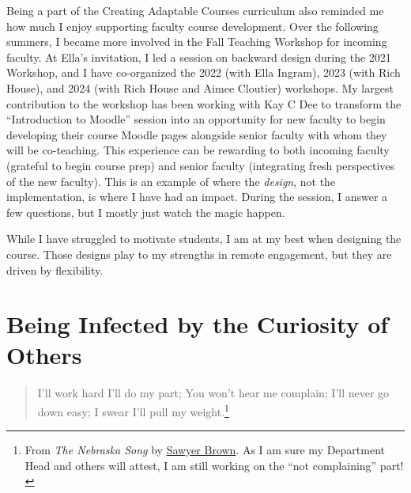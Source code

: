 \documentclass[
  letterpaper,
  DIV=11,
  numbers=noendperiod]{scrreprt}
\begin{document}
Being a part of the Creating Adaptable Courses curriculum also reminded
me how much I enjoy supporting faculty course development. Over the
following summers, I became more involved in the Fall Teaching Workshop
for incoming faculty. At Ella's invitation, I led a session on backward
design during the 2021 Workshop, and I have co-organized the 2022 (with
Ella Ingram), 2023 (with Rich House), and 2024 (with Rich House and
Aimee Cloutier) workshops. My largest contribution to the workshop has
been working with Kay C Dee to transform the ``Introduction to Moodle''
session into an opportunity for new faculty to begin developing their
course Moodle pages alongside senior faculty with whom they will be
co-teaching. This experience can be rewarding to both incoming faculty
(grateful to begin course prep) and senior faculty (integrating fresh
perspectives of the new faculty). This is an example of where the
\emph{design}, not the implementation, is where I have had an impact.
During the session, I answer a few questions, but I mostly just watch
the magic happen.

\begin{tcolorbox}[enhanced jigsaw, coltitle=black, colframe=quarto-callout-tip-color-frame, opacityback=0, rightrule=.15mm, bottomrule=.15mm, leftrule=.75mm, bottomtitle=1mm, colbacktitle=quarto-callout-tip-color!10!white, breakable, titlerule=0mm, title=\textcolor{quarto-callout-tip-color}{\faLightbulb}\hspace{0.5em}{Operating from My Strengths}, left=2mm, toptitle=1mm, toprule=.15mm, colback=white, arc=.35mm, opacitybacktitle=0.6]

While I have struggled to motivate students, I am at my best when
designing the course. Those designs play to my strengths in remote
engagement, but they are driven by flexibility.

\end{tcolorbox}


\chapter{Being Infected by the Curiosity of
Others}\label{being-infected-by-the-curiosity-of-others}

\begin{quote}
I'll work hard I'll do my part; You won't hear me complain; I'll never
go down easy; I swear I'll pull my weight.\footnote{From \emph{The
  Nebraska Song} by \href{https://sawyerbrown.com/}{Sawyer Brown}. As I
  am sure my Department Head and others will attest, I am still working
  on the ``not complaining'' part!}
\end{quote}
\end{document}

